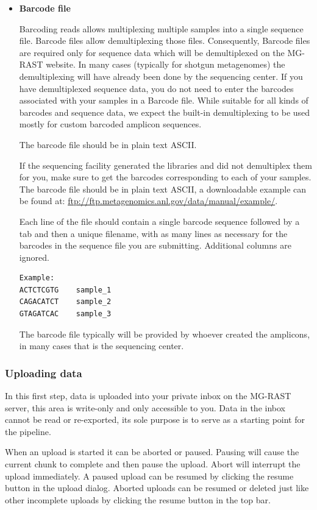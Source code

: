 \documentclass[12pt,fullpage]{report}
\begin{document}
\begin{itemize}
\item {\bf Barcode file}

Barcoding reads allows multiplexing multiple samples into a single sequence file. Barcode files allow demultiplexing those files. Consequently, Barcode files are required only for sequence data which will be demultiplexed on the MG-RAST website. In many cases (typically for shotgun metagenomes) the demultiplexing will have already been done by the sequencing center. If you have demultiplexed sequence data, you do not need to enter the barcodes associated with your samples in a Barcode file. While suitable for all kinds of barcodes and sequence data, we expect the built-in demultiplexing to be used mostly for custom barcoded amplicon sequences. 

The barcode file should be in plain text ASCII.

If the sequencing facility generated the libraries and did not demultiplex them for you, make sure to get the barcodes corresponding to each of your samples. The barcode file should be in plain text ASCII, a downloadable example can be found at: \url{ftp://ftp.metagenomics.anl.gov/data/manual/example/}. 

Each line of the file should contain a single barcode sequence followed by a tab and then a unique filename, with as many lines as necessary for the barcodes in the sequence file you are submitting.  Additional columns are ignored. 
\begin{verbatim}
Example:
ACTCTCGTG    sample_1
CAGACATCT    sample_2
GTAGATCAC    sample_3
\end{verbatim}

The barcode file typically will be provided by whoever created the amplicons, in many cases that is the sequencing center.  
\end{itemize} %


\subsubsection{Uploading data}
In this first step, data is uploaded into your private inbox on the MG-RAST server, this area is write-only and only accessible to you. Data in the inbox cannot be read or re-exported, its sole purpose is to serve as a starting point for the pipeline.

When an upload is started it can be aborted or paused. Pausing will cause the current chunk to complete and then pause the upload. Abort will interrupt the upload immediately. A paused upload can be resumed by clicking the resume button in the upload dialog. Aborted uploads can be resumed or deleted just like other incomplete uploads by clicking the resume button in the top bar.
\end{document}
